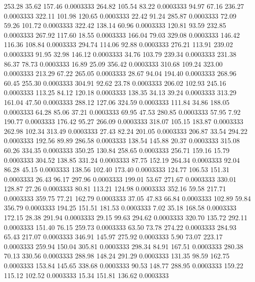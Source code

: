  253.28   35.62  157.46   0.0003333
 264.82  105.54   83.22   0.0003333
  94.97   67.16  236.27   0.0003333
 322.11  101.98  120.65   0.0003333
  22.42   91.24  285.87   0.0003333
  72.09   59.26  101.72   0.0003333
 322.42  138.14   60.96   0.0003333
 120.81   93.59  232.85   0.0003333
 267.92  117.60   18.55   0.0003333
 166.04   79.03  329.08   0.0003333
 146.42  116.36  108.84   0.0003333
 294.74  114.06   92.88   0.0003333
 276.21  113.91  239.02   0.0003333
  91.95   32.98  146.12   0.0003333
  34.76  103.79  239.34   0.0003333
 231.38   86.37   78.73   0.0003333
  16.89   25.09  356.42   0.0003333
 310.68  109.24  323.00   0.0003333
 213.29   67.22  265.05   0.0003333
  28.67   94.04  194.40   0.0003333
 268.96   60.45  255.30   0.0003333
 304.91   92.62   23.78   0.0003333
 206.02  102.93  245.16   0.0003333
 113.25   84.12  120.18   0.0003333
 138.35   34.13   39.24   0.0003333
 313.29  161.04   47.50   0.0003333
 288.12  127.06  324.59   0.0003333
 111.84   34.86  188.05   0.0003333
  64.28   85.06   37.21   0.0003333
  69.95   47.53  280.85   0.0003333
  57.95    7.92  190.77   0.0003333
 176.42   95.27  266.09   0.0003333
 318.07  105.15  183.87   0.0003333
 262.98  102.34  313.49   0.0003333
  27.43   82.24  201.05   0.0003333
 206.87   33.54  294.22   0.0003333
 192.56   89.89  286.58   0.0003333
 138.54  145.88   20.37   0.0003333
 315.08   60.26  334.35   0.0003333
 350.25  130.84  258.65   0.0003333
 256.71  159.16   15.79   0.0003333
 304.52  138.85  331.24   0.0003333
  87.75  152.19  264.34   0.0003333
  92.04   86.28   45.15   0.0003333
 138.56  102.40  173.40   0.0003333
 124.77  106.53  151.31   0.0003333
  26.43   96.17  297.96   0.0003333
 199.01   53.67  271.67   0.0003333
 330.01  128.87   27.26   0.0003333
  80.81  113.21  124.98   0.0003333
 352.16   59.58  217.71   0.0003333
 359.75   77.21  162.79   0.0003333
  37.05   47.83   66.84   0.0003333
 102.89   59.84  356.79   0.0003333
 194.25  151.51  181.53   0.0003333
   7.02   35.18  168.58   0.0003333
 172.15   28.38  291.94   0.0003333
  29.15   99.63  294.62   0.0003333
 320.70  135.72  292.11   0.0003333
 151.40   76.15  259.73   0.0003333
  63.50   73.78  274.22   0.0003333
 284.93   65.43  217.07   0.0003333
 346.91  145.97  275.92   0.0003333
   5.90   73.07  223.17   0.0003333
 259.94  150.04  305.81   0.0003333
 298.34   84.91  167.51   0.0003333
 280.38   70.13  330.56   0.0003333
 288.98  148.24  291.29   0.0003333
 131.35   98.59  162.75   0.0003333
 153.84  145.65  338.68   0.0003333
  90.53  148.77  288.95   0.0003333
 159.22  115.12  102.52   0.0003333
  15.34  151.81  136.62   0.0003333
